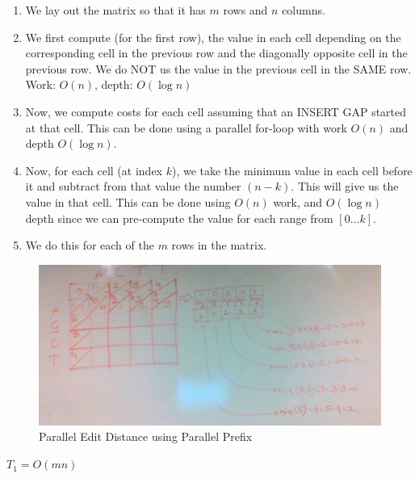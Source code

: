 \documentclass{article}
\begin{document}
\begin{enumerate}

\item We lay out the matrix so that it has $m$ rows and $n$ columns.

\item We first compute (for the first row), the value in each cell
  depending on the corresponding cell in the previous row and the
  diagonally opposite cell in the previous row. We do NOT us the value
  in the previous cell in the SAME row. Work: $O(n)$, depth: $O(\log{n})$

\item Now, we compute costs for each cell assuming that an INSERT GAP
  started at that cell. This can be done using a parallel for-loop
  with work $O(n)$ and depth $O(\log{n})$.

\item Now, for each cell (at index $k$), we take the minimum value in
  each cell before it and subtract from that value the number
  $(n-k)$. This will give us the value in that cell. This can be done
  using $O(n)$ work, and $O(\log{n})$ depth since we can pre-compute
  the value for each range from $[0 \ldots{} k]$.

\item We do this for each of the $m$ rows in the matrix.

\end{enumerate}

\begin{figure}[h!]
  \begin{center}
    \includegraphics[width=6in]{images/edit_diatance_using_parallel_prefix_small.png}
    \caption{Parallel Edit Distance using Parallel Prefix}
    \label{fig:pareditdistance}
  \end{center}
\end{figure}

$T_1 = O(mn)$
\end{document}
